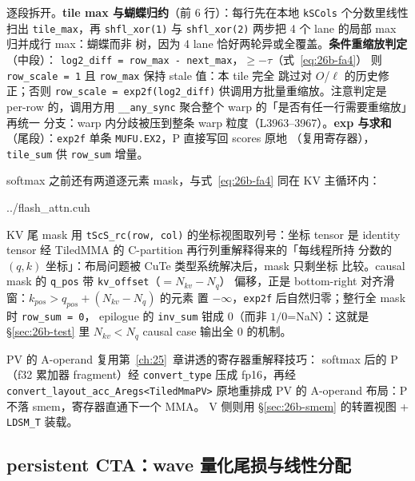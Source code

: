 逐段拆开。\textbf{tile max 与蝴蝶归约}（前 6 行）：每行先在本地
\texttt{kSCols} 个分数里线性扫出 \texttt{tile\_max}，再 \texttt{shfl\_xor(1)} 与
\texttt{shfl\_xor(2)} 两步把 4 个 lane 的局部 max 归并成行 max：蝴蝶而非
树，因为 4 lane 恰好两轮异或全覆盖。\textbf{条件重缩放判定}（中段）：
\texttt{log2\_diff = row\_max - next\_max}，$\ge -\tau$（式~\eqref{eq:26b-fa4}）
则 \texttt{row\_scale = 1} 且 \texttt{row\_max} 保持 stale 值：本 tile 完全
跳过对 $O$/$\ell$ 的历史修正；否则 \texttt{row\_scale = exp2f(log2\_diff)}
供调用方批量重缩放。注意判定是 per-row 的，调用方用
\texttt{\_\_any\_sync} 聚合整个 warp 的「是否有任一行需要重缩放」再统一
分支：warp 内分歧被压到整条 warp 粒度（L3963--3967）。\textbf{exp 与求和}
（尾段）：\texttt{exp2f} 单条 \texttt{MUFU.EX2}，P 直接写回 scores 原地
（复用寄存器），\texttt{tile\_sum} 供 \texttt{row\_sum} 增量。

softmax 之前还有两道逐元素 mask，与式~\eqref{eq:26b-fa4} 同在 KV 主循环内：

\begin{lstinputlisting}[linerange={3940-3967},firstnumber=auto,
  title={flash\_attn.cuh L3940-3967（双 mask：KV 尾部越界列 + causal 滑窗）}]{../flash_attn.cuh}
\end{lstinputlisting}

KV 尾 mask 用 \texttt{tScS\_rc(row, col)} 的坐标视图取列号：坐标 tensor 是
identity tensor 经 TiledMMA 的 C-partition 再行列重解释得来的「每线程所持
分数的 $(q, k)$ 坐标」：布局问题被 CuTe 类型系统解决后，mask 只剩坐标
比较。causal mask 的 \texttt{q\_pos} 带 \texttt{kv\_offset}（$=N_{kv}-N_q$）
偏移，正是 bottom-right 对齐滑窗：$k_{pos} > q_{pos} + (N_{kv}-N_q)$ 的元素
置 $-\infty$，\texttt{exp2f} 后自然归零；整行全 mask 时 \texttt{row\_sum = 0}，
epilogue 的 \texttt{inv\_sum} 钳成 0（而非 $1/0$=NaN）：这就是
\S\ref{sec:26b-test} 里 $N_{kv}{<}N_q$ causal case 输出全 0 的机制。

PV 的 A-operand 复用第~\ref{ch:25}~章讲透的寄存器重解释技巧：
softmax 后的 P（f32 累加器 fragment）经 \texttt{convert\_\allowbreak{}type}
压成 fp16，再经 \texttt{convert\_\allowbreak{}layout\_\allowbreak{}acc\_\allowbreak{}Aregs<TiledMmaPV>}
原地重排成 PV 的 A-operand 布局：P 不落 smem，寄存器直通下一个 MMA。
V 侧则用 \S\ref{sec:26b-smem} 的转置视图 + \texttt{LDSM\_T} 装载。

\subsection{persistent CTA：wave 量化尾损与线性分配}\label{sec:26b-persistent}

